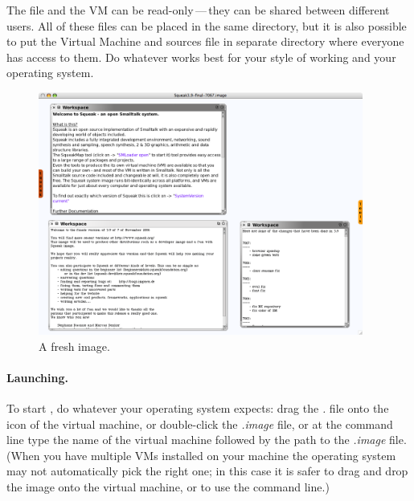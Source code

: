 \documentclass[a4paper,10pt,twoside]{book}
\begin{document}
The  file and the VM can be read-only\,---\,they can be shared between different users.
All of these files can be placed in the same directory, but it is also possible to put the Virtual Machine and sources file in separate directory where everyone has access to them.
Do whatever works best for your style of working and your operating system.


\begin{figure}[htb]
\centerline {\includegraphics[width=0.95\textwidth]{startup}}
\caption{A fresh \sq image.\label{fig:startup}}
\end{figure}

\paragraph{Launching.} To start \sq, do whatever your operating system expects: drag the \emph{.} file onto the icon of the virtual machine, or double-click the \emph{.image} file, or  at the command line type the name of the virtual machine followed by the path to the \emph{.image} file. (When you have multiple VMs installed on your machine the operating system may not automatically pick the right one; in this case it is safer to drag and drop the image onto the virtual machine, or to use the command line.)
\end{document}
